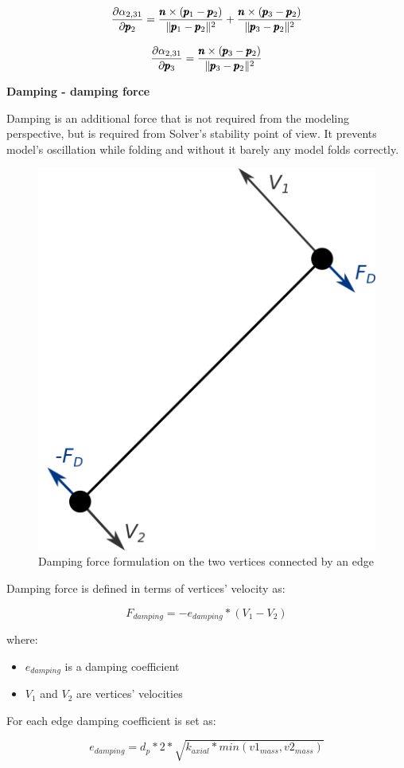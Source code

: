 \begin{equation} \label{Solver:face_force2}
	\frac{\partial \alpha _{2,31}}{\partial \pmb{p}_2} = \frac{\pmb{n} \times (\pmb{p}_1 - \pmb{p}_2)}{\|\pmb{p}_1 - \pmb{p}_2\|^2} + \frac{\pmb{n} \times (\pmb{p}_3 - \pmb{p}_2)}{\|\pmb{p}_3 - \pmb{p}_2\|^2}
\end{equation}

\begin{equation} \label{Solver:face_force3}
	\frac{\partial \alpha _{2,31}}{\partial \pmb{p}_3} = \frac{\pmb{n} \times (\pmb{p}_3 - \pmb{p}_2)}{\|\pmb{p}_3 - \pmb{p}_2\|^2}
\end{equation}


\medskip
\textbf{Damping - damping force}
\smallskip

Damping is an additional force that is not required from the modeling perspective,
but is required from Solver's stability point of view. It prevents model's
oscillation while folding and without it barely any model folds correctly.

\begin{figure}[H]
	\caption{Damping force formulation on the two vertices connected by an edge}
    \centering
	\includegraphics[width=.3\linewidth]{assets/3-damping_force_edge.png}
\end{figure}

Damping force is defined in terms of vertices' velocity as:


$$F_{damping} = -e_{damping} * (V_1 - V_2)$$

where:

\begin{itemize}
	\item $e_{damping}$ is a damping coefficient 
	\item $V_1$ and $V_2$ are vertices' velocities
\end{itemize}

For each edge damping coefficient is set as:

$$ e_{damping} = d_p * 2 * \sqrt{k_{axial} * min(v1_{mass}, v2_{mass})} $$

